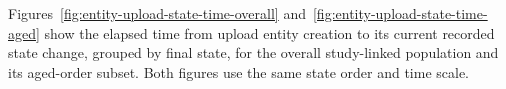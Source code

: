 \label{subsec:entity-upload-analysis}
Figures~\ref{fig:entity-upload-state-time-overall}
and~\ref{fig:entity-upload-state-time-aged} show the elapsed time from
upload entity creation to its current recorded state change, grouped by final
state, for the overall study-linked population and its aged-order subset.
Both figures use the same state order and time scale.








\clearpage
\linenumbers

\clearpage
\nolinenumbers
